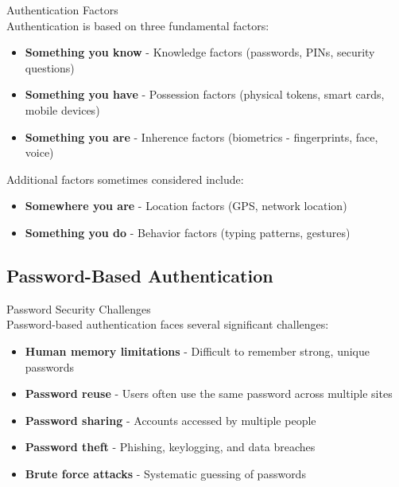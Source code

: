 \begin{definition}{Authentication Factors}\\
Authentication is based on three fundamental factors:
\begin{itemize}
    \item \textbf{Something you know} - Knowledge factors (passwords, PINs, security questions)
    \item \textbf{Something you have} - Possession factors (physical tokens, smart cards, mobile devices)
    \item \textbf{Something you are} - Inherence factors (biometrics - fingerprints, face, voice)
\end{itemize}
Additional factors sometimes considered include:
\begin{itemize}
    \item \textbf{Somewhere you are} - Location factors (GPS, network location)
    \item \textbf{Something you do} - Behavior factors (typing patterns, gestures)
\end{itemize}
\end{definition}

\subsection{Password-Based Authentication}

\begin{concept}{Password Security Challenges}\\
Password-based authentication faces several significant challenges:
\begin{itemize}
    \item \textbf{Human memory limitations} - Difficult to remember strong, unique passwords
    \item \textbf{Password reuse} - Users often use the same password across multiple sites
    \item \textbf{Password sharing} - Accounts accessed by multiple people
    \item \textbf{Password theft} - Phishing, keylogging, and data breaches
    \item \textbf{Brute force attacks} - Systematic guessing of passwords
\end{itemize}
\end{concept}

